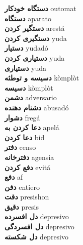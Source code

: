 \textbf{ دستگاه خودکار  } outomat \\
\textbf{ دستگاه  } aparato \\
\textbf{ دستگیر کردن  } arestá \\
\textbf{ دستگیری کردن  } yuda \\
\textbf{ دستیار  } yudadó \\
\textbf{ دستیاری کردن  } yuda \\
\textbf{ دستیاری  } yuda \\
\textbf{ دسیسه و توطئه  } kòmplòt \\
\textbf{ دسیسه  } kòmplòt \\
\textbf{ دشمن  } adversario \\
\textbf{ دشنام دهنده  } abusadó \\
\textbf{ دشوار  } fregá \\
\textbf{ دعا کردن به  } apelá \\
\textbf{ دعا کردن  } bid \\
\textbf{ دفتر  } censo \\
\textbf{ دفترخانه  } agensia \\
\textbf{ دفع کردن  } evitá \\
\textbf{ دفع  } af \\
\textbf{ دفن  } entiero \\
\textbf{ دقت  } presishon \\
\textbf{ دقیق  } presis \\
\textbf{ دل افسرده  } depresivo \\
\textbf{ دل افسردگی  } depresivo \\
\textbf{ دل شکسته  } depresivo \\
